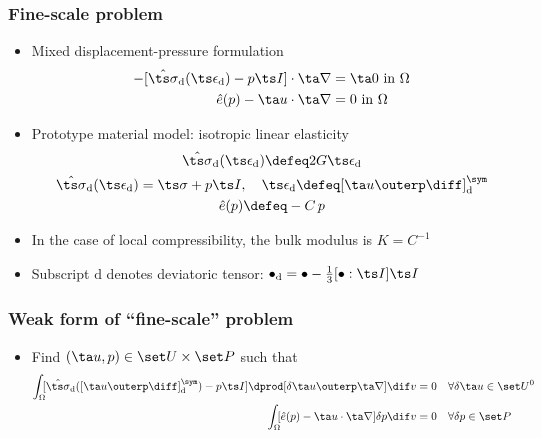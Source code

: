 \documentclass[11pt]{beamer} %
\renewcommand{\dev}{\mathrm{d}}
\newcommand{\external}{\mathrm{ext}}
\newcommand{\surf}{\mathrm{s}}
\newcommand{\pore}{\mathrm{pore}}
\begin{document}
\begin{frame}
 \frametitle{Fine-scale problem}
 \begin{itemize}
  \item Mixed displacement-pressure formulation
  \begin{align*}
   -[\hat{\ts\sigma}_\dev(\ts\epsilon_\dev) - p\ts I]\cdot\ta\nabla &= \ta 0 \text{ in } \Omega
    \\
    \hat{e}(p) - \ta u\cdot\ta\nabla &= 0\text{ in } \Omega%
  \end{align*}
  \item Prototype material model: isotropic linear elasticity
  \begin{gather*}
   \hat{\ts\sigma}_\dev(\ts\epsilon_\dev) \defeq 2 G \ts\epsilon_\dev\\
   \hat{\ts\sigma}_\dev(\ts\epsilon_\dev) = \ts\sigma + p\ts I,\quad \ts\epsilon_\dev \defeq [\ta u\outerp \diff]_\dev^\sym
   \\
   \hat{e}(p) \defeq -C\,p
  \end{gather*}
  \item In the case of local compressibility, the bulk modulus is $ K = C^{-1}$
  \item Subscript $\dev$ denotes deviatoric tensor: $\bullet_\dev = \bullet - \frac13 [\bullet:\ts I]\ts I$
 \end{itemize}
\end{frame}

\begin{frame}
 \frametitle{Weak form of ``fine-scale'' problem}
 \begin{itemize}
  \item %
Find $(\ta u,p)\in \set U \times \set P$ such that
\begin{align*}
  \int_{\mathrlap{\Omega}} \;[\hat{\ts\sigma}_\dev([\ta u\outerp\diff]_\dev^\sym)-p\ts I]\dprod[\delta\ta u\outerp\ta\nabla]\dif v &=
   0 %
    && \forall \delta \ta u\in \set U^0
\\
  \int_{\mathrlap{\Omega}} \;[\hat{e}(p) - \ta u\cdot\ta\nabla]\delta p \dif v &= 0 && \forall \delta p\in \set P
\end{align*}
 \end{itemize}
\end{frame}
\end{document}
